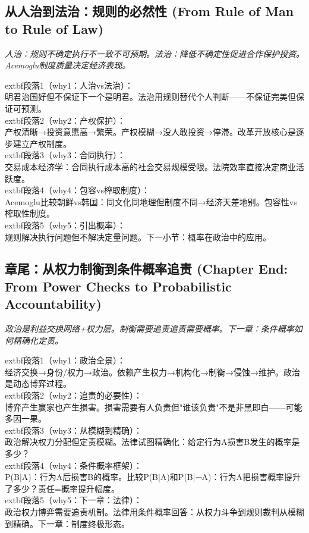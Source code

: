 \documentclass[a4paper,12pt]{book}
\newenvironment{motivation}{\begin{tcolorbox}[colback=gray!10,colframe=gray!60,title=\textit{本章动机},fonttitle=\bfseries,arc=0mm,leftrule=3mm]\small\itshape}{\end{tcolorbox}}
\begin{document}
\begin{motivation}
\begin{motivation}
\begin{motivation}
	\subsection{从人治到法治：规则的必然性 (From Rule of Man to Rule of Law)}
	\begin{motivation}人治：规则不确定执行不一致不可预期。法治：降低不确定性促进合作保护投资。Acemoglu制度质量决定经济表现。\end{motivation}
		extbf{段落1（why1：人治vs法治）}：\\明君治国好但不保证下一个是明君。法治用规则替代个人判断——不保证完美但保证可预测。\\	extbf{段落2（why2：产权保护）}：\\产权清晰→投资意愿高→繁荣。产权模糊→没人敢投资→停滞。改革开放核心是逐步建立产权制度。\\	extbf{段落3（why3：合同执行）}：\\交易成本经济学：合同执行成本高的社会交易规模受限。法院效率直接决定商业活跃度。\\	extbf{段落4（why4：包容vs榨取制度）}：\\Acemoglu比较朝鲜vs韩国：同文化同地理但制度不同→经济天差地别。包容性vs榨取性制度。\\	extbf{段落5（why5：引出概率）}：\\规则解决执行问题但不解决定量问题。下一小节：概率在政治中的应用。

	\subsection{章尾：从权力制衡到条件概率追责 (Chapter End: From Power Checks to Probabilistic Accountability)}
	\begin{motivation}政治是利益交换网络+权力层。制衡需要追责追责需要概率。下一章：条件概率如何精确化定责。\end{motivation}
		extbf{段落1（why1：政治全景）}：\\经济交换→身份/权力→政治。依赖产生权力→机构化→制衡→侵蚀→维护。政治是动态博弈过程。\\	extbf{段落2（why2：追责的必要性）}：\\博弈产生赢家也产生损害。损害需要有人负责但"谁该负责"不是非黑即白——可能多因一果。\\	extbf{段落3（why3：从模糊到精确）}：\\政治解决权力分配但定责模糊。法律试图精确化：给定行为A损害B发生的概率是多少？\\	extbf{段落4（why4：条件概率框架）}：\\P(B|A)：行为A后损害B的概率。比较P(B|A)和P(B|¬A)：行为A把损害概率提升了多少？责任=概率提升幅度。\\	extbf{段落5（why5：下一章：法律）}：\\政治权力博弈需要追责机制。法律用条件概率回答：从权力斗争到规则裁判从模糊到精确。下一章：制度终极形态。



\end{motivation}
\end{motivation}
\end{motivation}
\end{document}
